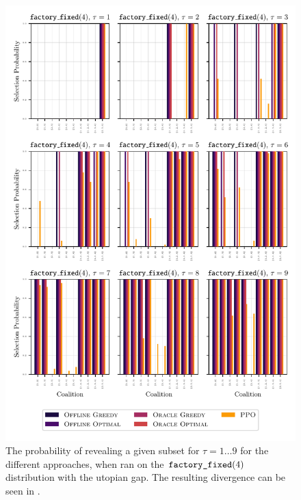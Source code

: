 \begin{figure}[t!]
  \centering
	\includegraphics[width=\textwidth]{figures/exploitability_factory_fixed4_coalition_bars.pdf}
	\caption{ The probability of revealing a given subset for $\tau=1\ldots 9$ for the different approaches, when ran on the $\factoryf[4]$ distribution with the utopian gap.
		The resulting divergence can be seen in .
	}
\end{figure}

